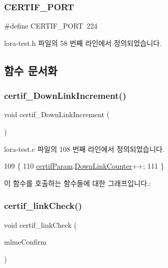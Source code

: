 \subsubsection{\texorpdfstring{C\+E\+R\+T\+I\+F\+\_\+\+P\+O\+RT}{CERTIF\_PORT}}
{\footnotesize\ttfamily \#define C\+E\+R\+T\+I\+F\+\_\+\+P\+O\+RT~224}



lora-\/test.\+h 파일의 58 번째 라인에서 정의되었습니다.



\subsection{함수 문서화}
\mbox{\label{lora-test_8h_afd08e01f379119849a415a1d98e44c0d}} 
\subsubsection{\texorpdfstring{certif\+\_\+\+Down\+Link\+Increment()}{certif\_DownLinkIncrement()}}
{\footnotesize\ttfamily void certif\+\_\+\+Down\+Link\+Increment (\begin{DoxyParamCaption}\item[{void}]{ }\end{DoxyParamCaption})}



lora-\/test.\+c 파일의 108 번째 라인에서 정의되었습니다.


\begin{DoxyCode}
109 \{
110     \mbox{\hyperlink{lora-test_8c_afed64ac962fb28f92cbc92acb72b0b7a}{certifParam}}.\mbox{\hyperlink{struct_compliance_test__s_a76fae6cae1874b9700238a561ef49305}{DownLinkCounter}}++;
111 \}
\end{DoxyCode}
이 함수를 호출하는 함수들에 대한 그래프입니다.\+:
\mbox{\label{lora-test_8h_a39763fc2f0d7f70bf980b9508cd7e021}} 
\subsubsection{\texorpdfstring{certif\+\_\+link\+Check()}{certif\_linkCheck()}}
{\footnotesize\ttfamily void certif\+\_\+link\+Check (\begin{DoxyParamCaption}\item[{\mbox{\hyperlink{group___l_o_r_a_m_a_c_ga73d9d9e11e282a6c258c4d22865fe824}{Mlme\+Confirm\+\_\+t}} $\ast$}]{mlme\+Confirm }\end{DoxyParamCaption})}



